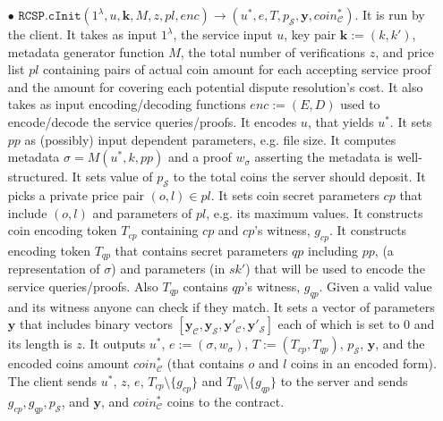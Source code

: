 \begin{definition}[RC-S-P Scheme]
\begin{itemize}
\item[$\bullet$] $\mathtt{RCSP}.\mathtt{cInit}(1^\lambda, u,\bm{k}, M,z, pl, enc)\rightarrow (u^{\scriptscriptstyle *},e,T, p_{\scriptscriptstyle\mathcal S},  \bm{y}, coin^{\scriptscriptstyle*}_{\scriptscriptstyle\mathcal C})$. It is run by the client. It takes as input $1^\lambda$,  the service input $u$, key pair  $\bm{k}:=(k, k')$,   metadata generator function $M$, the total number of verifications $z$, and  price list $pl$ containing pairs of  actual coin amount for each accepting service proof and the amount for covering each potential dispute resolution's cost.  It also takes as input encoding/decoding functions $enc:=(E,D)$ used to encode/decode the service queries/proofs.  It encodes $u$, that yields  $u^{\scriptscriptstyle *}$. {It  sets $pp$ as (possibly) input dependent parameters, e.g. file size.} It computes metadata $\sigma=M(u^{\scriptscriptstyle *},k,{pp})$ and a  proof $w_{\scriptscriptstyle\sigma}$ asserting the metadata is well-structured. It sets value of $p_{\scriptscriptstyle\mathcal S}$ to the total coins the server should deposit. It picks a private price pair $(o,l)\in pl$. It sets coin secret parameters $cp$ that include $(o,l)$ and parameters of $pl$, e.g. its maximum values. It constructs coin encoding token $T_{\scriptscriptstyle cp}$ containing   $cp$ and   $cp$'s witness, $g_{\scriptscriptstyle cp}$. It   constructs  encoding token $T_{\scriptscriptstyle qp}$ that contains secret  parameters $qp$ including {$pp$}, (a  representation of $\sigma$) and parameters (in $sk'$) that will be used to encode the service queries/proofs. Also  $T_{\scriptscriptstyle qp}$ contains     $qp$'s witness,  $g_{\scriptscriptstyle qp}$.   Given a valid value and its witness  anyone can check if they match. It sets a vector of parameters $\bm{y}$ that includes  binary vectors $[\bm{y}_{\scriptscriptstyle \mathcal  C}, \bm{y}_{\scriptscriptstyle \mathcal  S},\bm{y}'_{\scriptscriptstyle \mathcal  C}, \bm{y}'_{\scriptscriptstyle \mathcal  S}]$ each of which is set to $0$ and its length is $z$.  It outputs  $u^{\scriptscriptstyle *}$,  $e:=(\sigma,w_{\scriptscriptstyle\sigma})$,  $T:=(T_{\scriptscriptstyle cp},T_{\scriptscriptstyle qp})$,  $p_{\scriptscriptstyle\mathcal S}$,    $\bm{y}$,  and the encoded coins amount  $coin^{\scriptscriptstyle*}_{\scriptscriptstyle\mathcal C}$ (that contains $o$ and $l$ coins in an encoded form). The client sends  $u^{\scriptscriptstyle *}$, $z$,  $e$, $T_{\scriptscriptstyle cp} \setminus  \{g_{\scriptscriptstyle cp}\}$ and $T_{\scriptscriptstyle qp} \setminus  \{g_{\scriptscriptstyle qp}\}$ to the server and  sends $g_{\scriptscriptstyle cp},  g_{\scriptscriptstyle qp},p_{\scriptscriptstyle\mathcal S}$, and $\bm{y}$,  and $coin^{\scriptscriptstyle*}_{\scriptscriptstyle\mathcal C}$  coins to the  contract. 






\end{itemize}
\end{definition}
